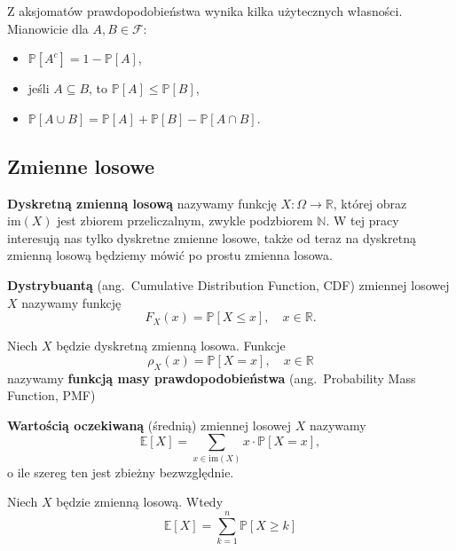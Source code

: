 \begin{fact}\label{F:prb}
Z aksjomatów prawdopodobieństwa wynika kilka użytecznych własności. Mianowicie dla $A,B\in\mathcal{F}$:
\begin{itemize}
    \item $\mathbb{P}[A^c] = 1 - \mathbb{P}[A]$,
    \item jeśli $A \subseteq B$, to $\mathbb{P}[A] \leq \mathbb{P}[B]$,
    \item $\mathbb{P}[A \cup B] = \mathbb{P}[A] + \mathbb{P}[B] - \mathbb{P}[A \cap B]$.
\end{itemize}
\end{fact}

\subsection{Zmienne losowe}

\begin{definition}
\textbf{Dyskretną zmienną losową} nazywamy funkcję $X : \Omega \to \mathbb{R}$, której obraz $\mathrm{im}(X)$ jest zbiorem przeliczalnym, zwykle podzbiorem $\mathbb{N}$. W tej pracy interesują nas tylko dyskretne zmienne losowe, także od teraz na dyskretną zmienną losową będziemy mówić po prostu zmienna losowa.  
\end{definition}

\begin{definition}
\textbf{Dystrybuantą} (ang.~Cumulative Distribution Function, CDF) zmiennej losowej $X$ nazywamy funkcję
\[
    F_X(x) = \mathbb{P}[X \leq x], \quad x \in \mathbb{R}.
\]
\end{definition}

\begin{definition}
Niech $X$ będzie dyskretną zmienną losowa. Funkcje 
\[
    \rho_X(x)=\mathbb{P}[X = x], \quad x \in \mathbb{R}
\]
nazywamy \textbf{funkcją masy prawdopodobieństwa} (ang.~Probability Mass Function, PMF)
\end{definition}

\begin{definition}
\textbf{Wartością oczekiwaną} (średnią) zmiennej losowej $X$ nazywamy
\[
    \mathbb{E}[X] = \sum_{x\in \mathrm{im}(X)} x \cdot \mathbb{P}[X = x],
\]
o ile szereg ten jest zbieżny bezwzględnie.
\end{definition}

\begin{fact}\label{F:expected_value_tail_sum}
Niech $X$ będzie zmienną losową. Wtedy 
\[
    \mathbb{E}[X] = \sum_{k=1}^{n} \mathbb{P}[X\ge k]
\]
\end{fact}

